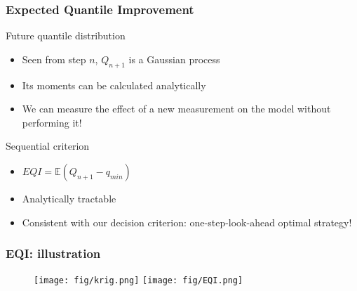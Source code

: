 \documentclass[10pt]{beamer}
\begin{document}
\frame
{
\frametitle{Expected Quantile Improvement}
\begin{block}{Future quantile distribution}
\begin{itemize}
	\item Seen from step $n$, $Q_{n+1}$ is a Gaussian process
	\item Its moments can be calculated analytically
	\item We can measure the effect of a new measurement on the model without performing it!
\end{itemize}
\end{block}

\begin{block}{Sequential criterion}
\begin{itemize}
 \item $EQI = \mathbb{E}\left( Q_{n+1} - q_{min}  \right)$
 \item Analytically tractable
 \item Consistent with our decision criterion: one-step-look-ahead optimal strategy!
\end{itemize}

\end{block}
}

\frame
{
\frametitle{EQI: illustration}
% 
% 
% 
\begin{figure}
	\centering
		\texttt{[image: fig/krig.png]}
		\texttt{[image: fig/EQI.png]}
\end{figure}
% 
}
\end{document}
